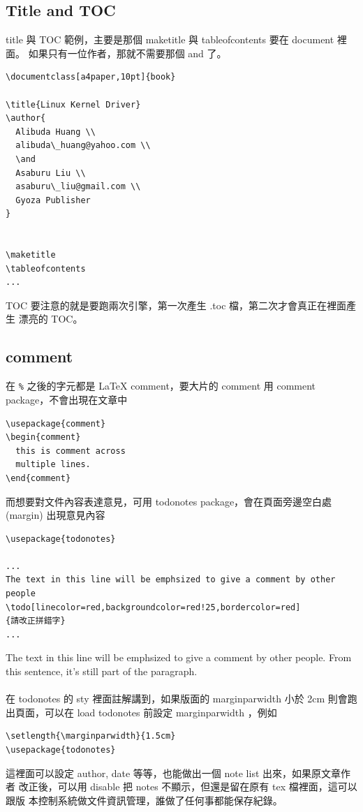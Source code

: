   \subsection{Title and TOC}
  title 與 TOC 範例，主要是那個 maketitle 與 tableofcontents 要在 document 裡
  面。 如果只有一位作者，那就不需要那個 and 了。
  \begin{verbatim}
\documentclass[a4paper,10pt]{book}

\title{Linux Kernel Driver}
\author{
  Alibuda Huang \\
  alibuda\_huang@yahoo.com \\
  \and 
  Asaburu Liu \\
  asaburu\_liu@gmail.com \\
  Gyoza Publisher
}


\maketitle
\tableofcontents
...

  \end{verbatim}
  TOC 要注意的就是要跑兩次引擎，第一次產生 .toc 檔，第二次才會真正在裡面產生
  漂亮的 TOC。

  \subsection{comment}
  在 \verb=%= 之後的字元都是 \LaTeX{} comment，要大片的 comment 用 comment
  package，不會出現在文章中
  \begin{verbatim}
\usepackage{comment}
\begin{comment}
  this is comment across
  multiple lines.
\end{comment}
  \end{verbatim}
  而想要對文件內容表達意見，可用 todonotes package，會在頁面旁邊空白處 (margin)
  出現意見內容
  \begin{verbatim}
\usepackage{todonotes}

...
The text in this line will be emphsized to give a comment by other people
\todo[linecolor=red,backgroundcolor=red!25,bordercolor=red]
{請改正拼錯字}
...
  \end{verbatim}
  The text in this line will be emphsized to give a comment by other people.
  From this sentence, it's still part of the paragraph.
  \\\\
  在 todonotes 的 sty 裡面註解講到，如果版面的 marginparwidth 小於 2cm 則會跑
  出頁面，可以在 load todonotes 前設定 marginparwidth ，例如
  \begin{verbatim}
\setlength{\marginparwidth}{1.5cm}
\usepackage{todonotes}
  \end{verbatim}
  這裡面可以設定 author, date 等等，也能做出一個 note list 出來，如果原文章作者
  改正後，可以用 disable 把 notes 不顯示，但還是留在原有 tex 檔裡面，這可以跟版
  本控制系統做文件資訊管理，誰做了任何事都能保存紀錄。

